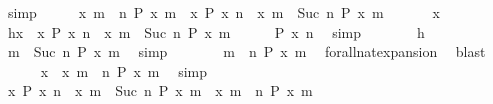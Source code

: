 \begin{isabellebody}
\ simp\isanewline
\ \ \isacommand{{\isacharbraceright}}\isamarkupfalse%
\ \isamarkupfalse%
\ {\isacartoucheopen}{\isacharbraceleft}x{\isachardot}\ {\isasymforall}m\ {\isasymge}\ n{\isachardot}\ P\ x\ m{\isacharbraceright}\ {\isasymsubseteq}\ {\isacharbraceleft}x{\isachardot}\ P\ x\ n{\isacharbraceright}\ {\isasyminter}\ {\isacharbraceleft}x{\isachardot}\ {\isasymforall}m\ {\isasymge}\ Suc\ n{\isachardot}\ P\ x\ m{\isacharbraceright}{\isacartoucheclose}\ \isacommand{{\isachardot}{\isachardot}}\isamarkupfalse%
\isanewline
{}\isamarkupfalse%
\isanewline
\ \ \isacommand{{\isacharbraceleft}}\isamarkupfalse%
\ \isamarkupfalse%
\ x\ \ \isamarkupfalse%
\ h{\isacharcolon}{\isacartoucheopen}x\ {\isasymin}\ {\isacharbraceleft}x{\isachardot}\ P\ x\ n{\isacharbraceright}\ {\isasyminter}\ {\isacharbraceleft}x{\isachardot}\ {\isasymforall}m\ {\isasymge}\ Suc\ n{\isachardot}\ P\ x\ m{\isacharbraceright}{\isacartoucheclose}\isanewline
\ \ \ \ \isamarkupfalse%
\ {\isacartoucheopen}P\ x\ n{\isacartoucheclose}\ \isamarkupfalse%
\ simp\isanewline
\ \ \ \ \isamarkupfalse%
\ \isamarkupfalse%
\ h\ \isamarkupfalse%
\ {\isacartoucheopen}{\isasymforall}m\ {\isasymge}\ Suc\ n{\isachardot}\ P\ x\ m{\isacartoucheclose}\ \isamarkupfalse%
\ simp\isanewline
\ \ \ \ \isamarkupfalse%
\ \isamarkupfalse%
\ {\isacartoucheopen}{\isasymforall}m\ {\isasymge}\ n{\isachardot}\ P\ x\ m{\isacartoucheclose}\ \isamarkupfalse%
\ forall{\isacharunderscore}nat{\isacharunderscore}expansion\ \isamarkupfalse%
\ blast\isanewline
\ \ \ \ \isamarkupfalse%
\ {\isacartoucheopen}x\ {\isasymin}\ {\isacharbraceleft}x{\isachardot}\ {\isasymforall}m\ {\isasymge}\ n{\isachardot}\ P\ x\ m{\isacharbraceright}{\isacartoucheclose}\ \isamarkupfalse%
\ simp\isanewline
\ \ \isacommand{{\isacharbraceright}}\isamarkupfalse%
\ \isamarkupfalse%
\ {\isacartoucheopen}{\isacharbraceleft}x{\isachardot}\ P\ x\ n{\isacharbraceright}\ {\isasyminter}\ {\isacharbraceleft}x{\isachardot}\ {\isasymforall}m\ {\isasymge}\ Suc\ n{\isachardot}\ P\ x\ m{\isacharbraceright}\ {\isasymsubseteq}\ {\isacharbraceleft}x{\isachardot}\ {\isasymforall}m\ {\isasymge}\ n{\isachardot}\ P\ x\ m{\isacharbraceright}{\isacartoucheclose}\ \isacommand{{\isachardot}{\isachardot}}\isamarkupfalse%
\isanewline
{}\isamarkupfalse%
%
\endisatagproof
{\isafoldproof}%
%

\end{isabellebody}
